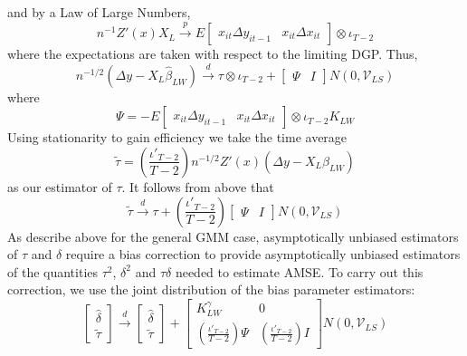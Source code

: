and by a Law of Large Numbers,
	$$n^{-1}Z'(x)X_L \overset{p}{\rightarrow} E\left[\begin{array}{cc} x_{it}\Delta y_{it-1} & x_{it}\Delta x_{it}\end{array} \right]\otimes \iota_{T-2}$$
where the expectations are taken with respect to the limiting DGP. 
Thus,
	\begin{equation}
		n^{-1/2}(\Delta y -X_L\widehat{\beta}_{LW}) \overset{d}{\rightarrow} \tau \otimes \iota_{T-2} + \left[ \begin{array}{cc} \Psi & I\end{array}\right] N(0, \mathcal{V}_{LS})
	\end{equation}
where
\begin{equation}
	\Psi = -E\left[\begin{array}{cc} x_{it}\Delta y_{it-1} & x_{it}\Delta x_{it}\end{array} \right]\otimes \iota_{T-2} K_{LW}
\end{equation}
Using stationarity to gain efficiency we take the time average
\begin{equation}
\widetilde{\tau} =  \left(\frac{\iota'_{T-2}}{T-2} \right)n^{-1/2} Z'(x)(\Delta y - X_L \widehat{\beta}_{LW})
\end{equation}
as our estimator of $\tau$. 
It follows from above that
\begin{equation}
	\widetilde{\tau} \overset{d}{\rightarrow} \tau + \left(\frac{\iota'_{T-2}}{T-2} \right)\left[ \begin{array}{cc} \Psi & I\end{array}\right] N(0, \mathcal{V}_{LS})
\end{equation}
As describe above for the general GMM case, asymptotically unbiased estimators of $\tau$ and $\delta$ require a bias correction to provide asymptotically unbiased estimators of the quantities $\tau^2$, $\delta^2$ and $\tau\delta$ needed to estimate AMSE. 
To carry out this correction, we use the joint distribution of the bias parameter estimators:
	\begin{equation}
	 \left[\begin{array}{c} \widehat{\delta} \\ \widetilde{\tau}  \end{array} \right] \overset{d}{\rightarrow} \left[\begin{array}{c} \widehat{\delta} \\ \widetilde{\tau}  \end{array} \right]  + \left[\begin{array}{cc} K_{LW}^\gamma&0 \\ \left(\frac{\iota'_{T-2}}{T-2} \right) \Psi&  \left(\frac{\iota'_{T-2}}{T-2} \right) I\end{array} \right] N(0, \mathcal{V}_{LS})
	\end{equation}
